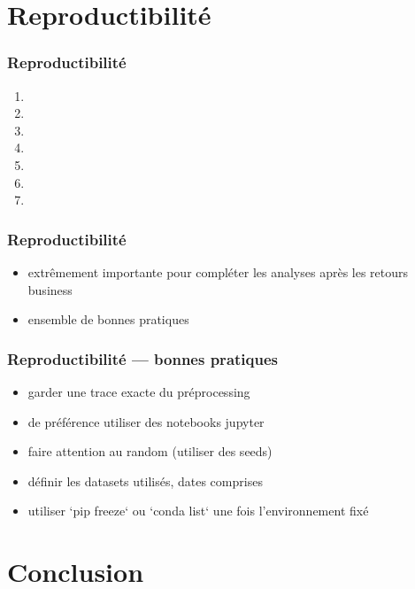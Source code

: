 \documentclass{formation}
\begin{document}
\section{Reproductibilité}

\begin{frame}
  \frametitle{Reproductibilité}

  \begin{enumerate}
  \item {}
  \item {}
  \item {}
  \item {}
  \item {}
  \item {}
  \item {}
  \end{enumerate}
\end{frame}

\begin{frame}
  \frametitle{Reproductibilité}

  \begin{itemize}
  \item extrêmement importante pour compléter les analyses après les
    retours business
  \item ensemble de bonnes pratiques
  \end{itemize}
\end{frame}

\begin{frame}
  \frametitle{Reproductibilité — bonnes pratiques}

  \begin{itemize}[<+->]
  \item garder une trace exacte du préprocessing
  \item de préférence utiliser des notebooks jupyter
  \item faire attention au random (utiliser des seeds)
  \item définir les datasets utilisés, dates comprises
  \item utiliser `pip freeze` ou `conda list` une fois l'environnement
    fixé
  \end{itemize}
\end{frame}

\section{Conclusion}
\end{document}
